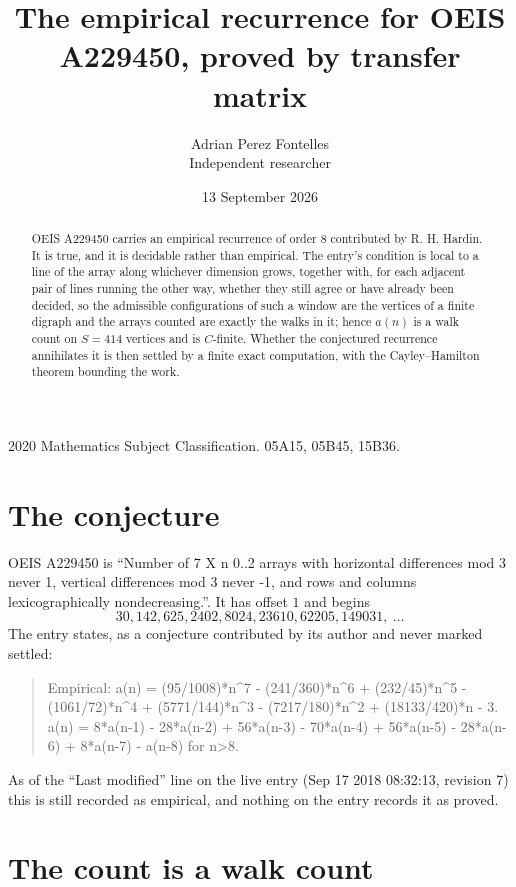 \documentclass[11pt,a4paper]{article}
\title{The empirical recurrence for OEIS A229450, proved by transfer matrix}
\author{Adrian Perez Fontelles\\ \small Independent researcher}
\date{13 September 2026}
\theoremstyle{plain}
\theoremstyle{definition}
\begin{document}
\maketitle

\begin{abstract}
OEIS A229450 carries an empirical recurrence of order $8$ contributed by R. H. Hardin. It is
true, and it is decidable rather than empirical. The entry's condition is local to a line of the array along whichever dimension grows, together with, for each adjacent pair of lines running the other way, whether they still agree or have already been decided, so
the admissible configurations of such a window are the vertices of a finite digraph and the
arrays counted are exactly the walks in it; hence $a(n)$ is a walk count on $S=414$ vertices
and is $C$-finite. Whether the conjectured recurrence annihilates it is then settled by a
finite exact computation, with the Cayley--Hamilton theorem bounding the work.
\end{abstract}

\noindent\small 2020 Mathematics Subject Classification. 05A15, 05B45, 15B36.\normalsize

\section{The conjecture}

OEIS A229450 is ``Number of 7 X n 0..2 arrays with horizontal differences mod 3 never 1, vertical differences mod 3 never -1, and rows and columns lexicographically nondecreasing.''. It has offset $1$ and begins
\[
30, 142, 625, 2402, 8024, 23610, 62205, 149031,\ \dots
\]
The entry states, as a conjecture contributed by its author and never marked settled:
\begin{quote}
Empirical: a(n) = (95/1008)*n\^{}7 - (241/360)*n\^{}6 + (232/45)*n\^{}5 - (1061/72)*n\^{}4 + (5771/144)*n\^{}3 - (7217/180)*n\^{}2 + (18133/420)*n - 3. a(n) = 8*a(n-1) - 28*a(n-2) + 56*a(n-3) - 70*a(n-4) + 56*a(n-5) - 28*a(n-6) + 8*a(n-7) - a(n-8) for n>8.
\end{quote}
As of the ``Last modified'' line on the live entry (Sep 17 2018 08:32:13, revision 7) this is still
recorded as empirical, and nothing on the entry records it as proved.

\section{The count is a walk count}
\end{document}
